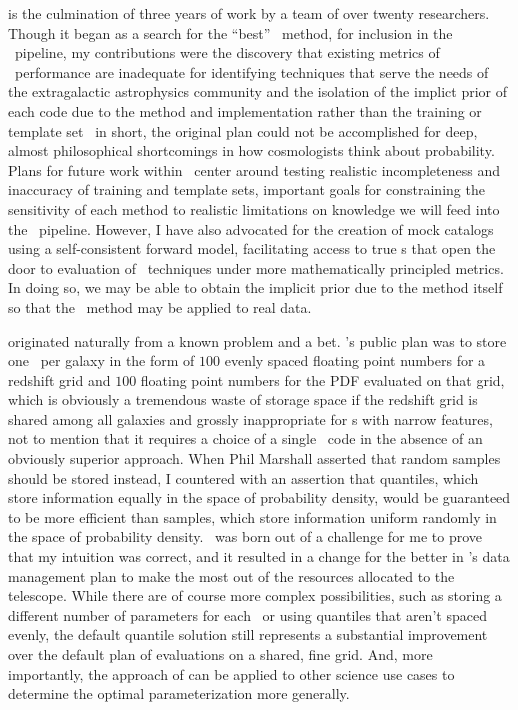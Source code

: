  is the culmination of three years of work by a team of over twenty researchers.
Though it began as a search for the ``best'' \pzpdf\ method, for inclusion in the \lsst\ pipeline, my contributions were the discovery that existing metrics of \pzpdf\ performance are inadequate for identifying techniques that serve the needs of the extragalactic astrophysics community and the isolation of the implict prior of each code due to the method and implementation rather than the training or template set \textemdash\ in short, the original plan could not be accomplished for deep, almost philosophical shortcomings in how cosmologists think about probability.
Plans for future work within \desc\ center around testing realistic incompleteness and inaccuracy of training and template sets, important goals for constraining the sensitivity of each method to realistic limitations on knowledge we will feed into the \desc\ pipeline.
However, I have also advocated for the creation of mock catalogs using a self-consistent forward model, facilitating access to true \pzpdf s that open the door to evaluation of \pzpdf\ techniques under more mathematically principled metrics.
In doing so, we may be able to obtain the implicit prior due to the method itself so that the \Chippr\ method may be applied to real data.

 originated naturally from a known problem and a bet.
\lsst's public plan was to store one \pzpdf\ per galaxy in the form of $100$ evenly spaced floating point numbers for a redshift grid and $100$ floating point numbers for the PDF evaluated on that grid, which is obviously a tremendous waste of storage space if the redshift grid is shared among all galaxies and grossly inappropriate for \pzpdf s with narrow features, not to mention that it requires a choice of a single \pzpdf\ code in the absence of an obviously superior approach.
When Phil Marshall asserted that random samples should be stored instead, I countered with an assertion that quantiles, which store information equally in the space of probability density, would be guaranteed to be more efficient than samples, which store information uniform randomly in the space of probability density.
\qp\ was born out of a challenge for me to prove that my intuition was correct, and it resulted in a change for the better in \lsst's data management plan to make the most out of the resources allocated to the telescope.
While there are of course more complex possibilities, such as storing a different number of parameters for each \pzpdf\ or using quantiles that aren't spaced evenly, the default quantile solution still represents a substantial improvement over the default plan of evaluations on a shared, fine grid.
And, more importantly, the approach of  can be applied to other science use cases to determine the optimal parameterization more generally.

